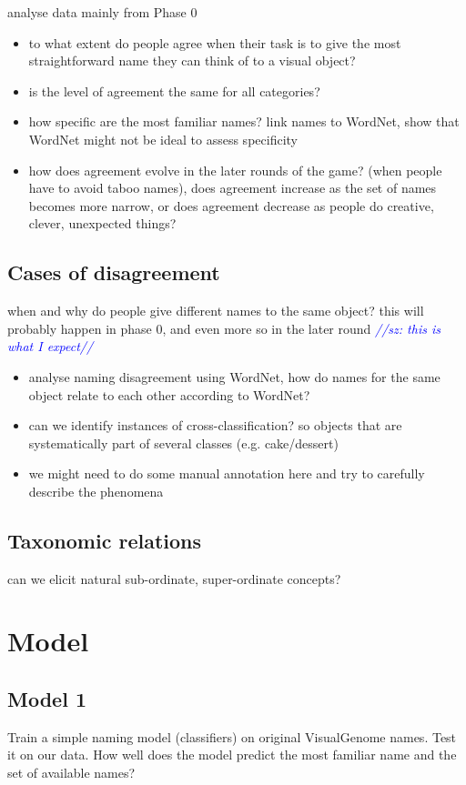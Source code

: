 \documentclass[11pt]{article}
\newcommand{\sz}[1]{\textcolor{blue}{\emph{//sz: #1//}}}
\begin{document}
analyse data mainly from Phase 0

\begin{itemize}
\item  to what extent do people agree when their task is to give the most straightforward name they can think of to a visual object?
\item is the level of agreement the same for all categories?
\item how specific are the most familiar names? link names to WordNet, show that WordNet might not be ideal to assess specificity
\item how does agreement evolve in the later rounds of the game? (when people have to avoid taboo names), does agreement increase as the set of names becomes more narrow, or  does agreement decrease as people do creative, clever, unexpected things?
\end{itemize}

\subsection{Cases of disagreement}

when and why do people give different names to the same object? this will probably happen in phase 0, and even more so in the later round \sz{this is what I expect}

\begin{itemize}
\item  analyse naming disagreement using WordNet, how do names for the same object relate to each other according to WordNet?
\item can we identify instances of cross-classification? so objects that are systematically part of several classes (e.g. cake/dessert)
\item we might need to do some manual annotation here and try to carefully describe the phenomena
\end{itemize}

\subsection{Taxonomic relations}

can we elicit natural sub-ordinate, super-ordinate concepts?

\section{Model}

\subsection{Model 1}
Train a simple naming model (classifiers) on original VisualGenome names. Test it on our data. How well does the model predict the most familiar name and the set of available names?
\end{document}
